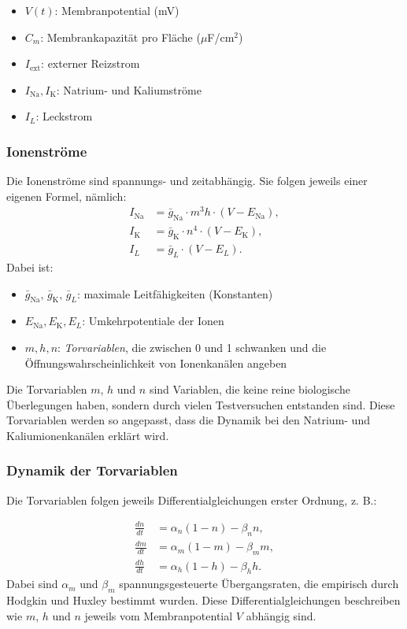 \begin{itemize}
	\item $V(t)$: Membranpotential (mV)
	\item $C_m$: Membrankapazität pro Fläche ($\mu$F/cm$^2$)
	\item $I_{\text{ext}}$: externer Reizstrom
	\item $I_{\text{Na}}, I_{\text{K}}$: Natrium- und Kaliumströme
	\item $I_L$: Leckstrom
\end{itemize}
\subsubsection{Ionenströme}
Die Ionenströme sind spannungs- und zeitabhängig. Sie folgen jeweils einer eigenen Formel, nämlich:
\[
\begin{aligned}
	I_{\text{Na}} &= \bar{g}_{\text{Na}} \cdot m^3 h \cdot (V - E_{\text{Na}}), \\
	I_{\text{K}} &= \bar{g}_{\text{K}} \cdot n^4 \cdot (V - E_{\text{K}}), \\
	I_L &= \bar{g}_L \cdot (V - E_L).
\end{aligned}
\]
Dabei ist:

\begin{itemize}
	\item $\bar{g}_{\text{Na}},\, \bar{g}_{\text{K}},\, \bar{g}_L$: maximale Leitfähigkeiten (Konstanten)
	\item $E_{\text{Na}}, E_{\text{K}}, E_L$: Umkehrpotentiale der Ionen
%
	\item $m, h, n$: \emph{Torvariablen}, die zwischen 0 und 1 schwanken und die Öffnungswahrscheinlichkeit von Ionenkanälen angeben
%
\end{itemize}
Die Torvariablen $m$, $h$ und $n$ sind Variablen, die keine reine biologische Überlegungen haben, sondern durch vielen Testversuchen entstanden sind. Diese Torvariablen werden so angepasst, dass die Dynamik bei den Natrium- und Kaliumionenkanälen erklärt wird.
\subsubsection{Dynamik der Torvariablen}
Die Torvariablen folgen jeweils Differentialgleichungen erster Ordnung, z. B.:

\begin{align}
	\frac{dn}{dt} &= \alpha_n (1 - n) - \beta_n n,\\
	\frac{dm}{dt} &= \alpha_m (1 - m) - \beta_m m,\\
	\frac{dh}{dt} &= \alpha_h (1 - h) - \beta_h h.
\end{align}
Dabei sind $\alpha_m$ und $\beta_m$ spannungsgesteuerte Übergangsraten, die empirisch durch Hodgkin und Huxley bestimmt wurden.
Diese Differentialgleichungen beschreiben wie $m$, $h$ und $n$ jeweils vom Membranpotential $V$ abhängig sind.
